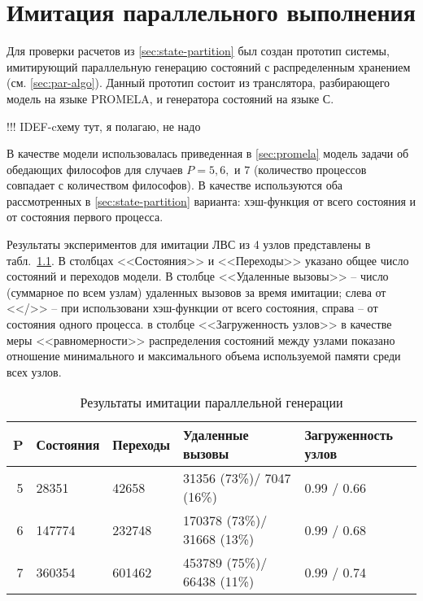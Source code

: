 \chapter{Имитация параллельного выполнения}
\label{cha:paremu}

Для проверки расчетов из \ref{sec:state-partition} был создан прототип
системы, имитирующий параллельную генерацию состояний с распределенным
хранением (см. \ref{sec:par-algo}). Данный прототип состоит из
транслятора, разбирающего модель на языке PROMELA, и генератора
состояний на языке С.

!!! IDEF-cхему тут, я полагаю, не надо

В качестве модели использовалась приведенная в \ref{sec:promela}
модель задачи об обедающих философов для случаев $P = 5, 6, \text{ и }
7$ (количество процессов совпадает с количеством философов). В
качестве  используются оба рассмотренных в
\ref{sec:state-partition} варианта: хэш-функция от всего состояния и
от состояния первого процесса. 

Результаты экспериментов для имитации ЛВС из 4 узлов представлены в
табл.~\ref{tab:paremu-stats}. В столбцах <<Состояния>> и <<Переходы>> указано
общее число состояний и переходов модели. В столбце <<Удаленные вызовы>> --
число (суммарное по всем узлам) удаленных вызовов за время имитации; слева от
<</>> -- при использовани хэш-функции от всего состояния, справа -- от состояния
одного процесса. в столбце <<Загруженность узлов>> в качестве меры
<<равномерности>> распределения состояний между узлами показано отношение
минимального и максимального объема используемой памяти среди всех узлов.

\begin{table}[ht]
  \centering
  \begin{tabular}[ht]{|r|l|l|l|p{}|}
    \hline
    P & Состояния & Переходы & Удаленные вызовы & Загруженность узлов    \\
    \hline
    5 & 28351     & 42658    & 31356  (73\%)/ 7047  (16\%) & 0.99 / 0.66 \\ 
    6 & 147774    & 232748   & 170378 (73\%)/ 31668 (13\%) & 0.99 / 0.68 \\ 
    7 & 360354    & 601462   & 453789 (75\%)/ 66438 (11\%) & 0.99 / 0.74 \\ 
    \hline
  \end{tabular}
  \caption{Результаты имитации параллельной генерации}
  \label{tab:paremu-stats}
\end{table}


